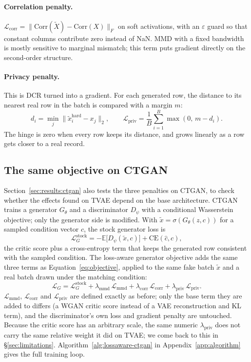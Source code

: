 \documentclass[11pt,a4paper]{article}
\newcommand{\Lmmd}{\mathcal{L}_{\text{mmd}}}
\newcommand{\Lcorr}{\mathcal{L}_{\text{corr}}}
\newcommand{\Lpriv}{\mathcal{L}_{\text{priv}}}
\newcommand{\lmmd}{\lambda_{\text{mmd}}}
\newcommand{\lcorr}{\lambda_{\text{corr}}}
\newcommand{\lpriv}{\lambda_{\text{priv}}}
\begin{document}
\paragraph{Correlation penalty.}
$\Lcorr = \|\mathrm{Corr}(\tilde{X}) - \mathrm{Corr}(X)\|_F$ on soft
activations, with an $\varepsilon$ guard so that constant columns contribute
zero instead of NaN. MMD with a fixed bandwidth is mostly sensitive to
marginal mismatch; this term puts gradient directly on the second-order
structure.

\paragraph{Privacy penalty.}
This is DCR turned into a gradient. For each generated row, the distance to
its nearest real row in the batch is compared with a margin $m$:
\begin{equation}
d_i = \min_j \|\tilde{x}^{\text{hard}}_i - x_j\|_2, \qquad
\Lpriv = \frac{1}{B}\sum_{i=1}^{B}\max(0,\, m - d_i).
\label{eq:hinge}
\end{equation}
The hinge is zero when every row keeps its distance, and grows linearly as a
row gets closer to a real record.

\subsection{The same objective on CTGAN}
\label{sec:lossaware:ctgan}

Section~\ref{sec:results:ctgan} also tests the three penalties on CTGAN, to
check whether the effects found on TVAE depend on the base architecture.
CTGAN \citep{xu2019ctgan} trains a generator $G_\theta$ and a discriminator
$D_\psi$ with a conditional Wasserstein objective; only the generator side is
modified. With $\tilde x = \sigma(G_\theta(z, c))$ for a sampled condition
vector $c$, the stock generator loss is
\begin{equation}
\mathcal{L}_G^{\text{stock}} = -\mathbb{E}\big[D_\psi(\tilde x, c)\big] + \text{CE}(\hat c, c),
\end{equation}
the critic score plus a cross-entropy term that keeps the generated row
consistent with the sampled condition. The loss-aware generator objective
adds the same three terms as Equation~\ref{eq:objective}, applied to the same
fake batch $\tilde x$ and a real batch drawn under the matching condition:
\begin{equation}
\mathcal{L}_G = \mathcal{L}_G^{\text{stock}} + \lmmd\,\Lmmd + \lcorr\,\Lcorr + \lpriv\,\Lpriv .
\label{eq:objective-ctgan}
\end{equation}
$\Lmmd$, $\Lcorr$ and $\Lpriv$ are defined exactly as before; only the base
term they are added to differs (a WGAN critic score instead of a VAE
reconstruction and KL term), and the discriminator's own loss and gradient
penalty are untouched. Because the critic score has an arbitrary scale, the
same numeric $\lpriv$ does not carry the same relative weight it did on TVAE;
we come back to this in \S\ref{sec:limitations}. Algorithm~\ref{alg:lossaware-ctgan}
in Appendix~\ref{app:algorithm} gives the full training loop.
\end{document}
